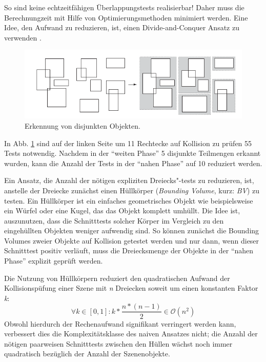 So sind keine echtzeitf\"ahigen \"Uberlappungstests realisierbar! Daher muss die
Berechnungzeit mit Hilfe von Optimierungsmethoden minimiert werden. Eine Idee,
den Aufwand zu reduzieren, ist, einen Divide-and-Conquer Ansatz zu verwenden \cite{Ericson05}. 


\begin{figure}[H]
\centerline{
	\includegraphics[width=0.7\columnwidth]{graphics/box.png}
}
\caption{Erkennung von disjunkten Objekten.}
\label{broadbox}
\end{figure}

In Abb. \ref{broadbox} sind auf der linken Seite um 11 Rechtecke auf Kollision zu pr\"ufen 55 Tests notwendig.
Nachdem in der "`weiten Phase"' 5 disjunkte Teilmengen erkannt wurden, kann die Anzahl der Tests in der "`nahen Phase"' auf 10 reduziert werden.

Ein Ansatz, die Anzahl der n\"otigen expliziten Dreiecks"-tests zu reduzieren, ist, anstelle der Dreiecke zun\"achst einen H\"ullk\"orper ({\em Bounding Volume}, kurz: {\em BV}) zu testen. Ein  H\"ullk\"orper ist ein
einfaches geometrisches Objekt wie beispielsweise ein W\"urfel oder eine Kugel, das das Objekt komplett
umh\"ullt. Die Idee ist, auszunutzen, dass die Schnitttests solcher K\"orper im Vergleich zu den eingeh\"ullten Objekten weniger aufwendig sind. So k\"onnen zun\"achst die Bounding Volumes zweier Objekte auf Kollision
getest\-et werden und nur dann, wenn dieser Schnitttest positiv verl\"auft, muss
die Dreiecksmenge der Objekte in der "`nahen Phase"' explizit gepr\"uft werden.

Die Nutzung von H\"ullk\"orpern reduziert den quadratischen Aufwand der Kollisionsp\"ufung einer Szene mit {\em n} Dreiecken soweit um einen konstanten Faktor {\em k}:
\begin{equation}
\forall k \in [0,1]:
k* \frac{n*(n-1)}{2} 
\in \mathcal O(n^2)
\end{equation}
Obwohl hierdurch der Rechenaufwand signifikant verringert werden kann, verbessert dies die Komplexit\"atsklasse des naiven Ansatzes nicht; die Anzahl der n\"otigen paarweisen Schnitttests zwischen den H\"ullen w\"achst noch immer
quadratisch bez\"uglich der Anzahl der Szenenobjekte.

